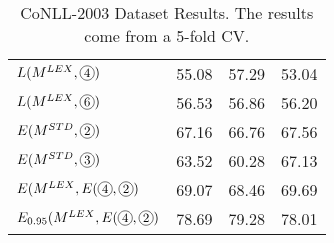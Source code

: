 \begin{table}[]
\begin{tabular}{@{\makebox[1.50em][l]{\rownumber\space}}lccc@{}}
%

$L(M^{LEX}, \circlednumber{4})$      & 55.08           & 57.29          & 53.04           \\ 
$L(M^{LEX}, \circlednumber{6})$      & 56.53           & 56.86           & 56.20           \\  
\midrule


%
$E(M^{STD}, \circlednumber{2})$      & 67.16          & 66.76           & 67.56	          \\
$E(M^{STD}, \circlednumber{3})$      & 63.52          & 60.28           & 67.13	          \\ 
%
$E(M^{LEX}, E(\circlednumber{4}, \circlednumber{2})$       & 69.07          & 68.46           & 69.69         \\
$E_{0.95}(M^{LEX}, E(\circlednumber{4}, \circlednumber{2})$       & 78.69          & 79.28           & 78.01         \\

\bottomrule
\end{tabular}
\caption{CoNLL-2003 Dataset Results. The results come from a 5-fold CV.}
\label{tab:wikigold}
\end{table}
